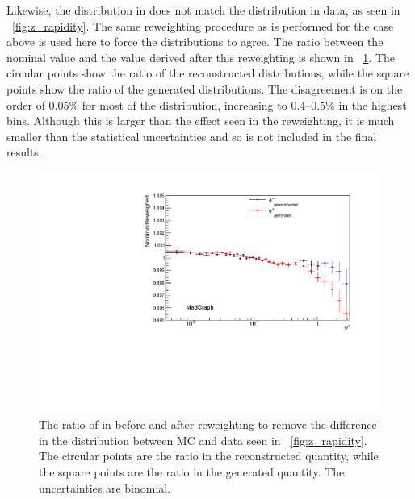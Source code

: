 Likewise, the \Z \rapidity distribution in \MADGRAPH does not match the
distribution in data, as seen in \FIG~\ref{fig:z_rapidity}. The same
reweighting procedure as is performed for the \mee case above is used here to
force the distributions to agree. The ratio between the nominal \phistar value
and the value derived after this reweighting is shown in
\FIG~\ref{fig:z_rapidity_reweighted}.
The circular points show the ratio of the
reconstructed \phistar distributions, while the square points show the ratio of
the generated \phistar distributions. The disagreement is on the order of
0.05\% for most of the distribution, increasing to 0.4--0.5\% in the highest
\phistar bins. Although this is larger than the effect seen in the \mee
reweighting, it is much smaller than the statistical uncertainties and so is
not included in the final results.

\begin{figure}[!htbp]
    \centering
    \includegraphics[width=\textwidth]{figures/ZY_reweighed.pdf}
    \caption[
        The ratio of \phistar in \MADGRAPH before and after reweighting to
        remove the differnce in the \rapidity distribution between MC and data.
    ]{
        The ratio of \phistar in \MADGRAPH before and after reweighting to
        remove the difference in the \rapidity distribution between MC and data
        seen in \FIG~\ref{fig:z_rapidity}. The circular points are the ratio in
        the reconstructed quantity, while the square points are the ratio in
        the generated quantity. The uncertainties are binomial.
    }
    \label{fig:z_rapidity_reweighted}
\end{figure}

